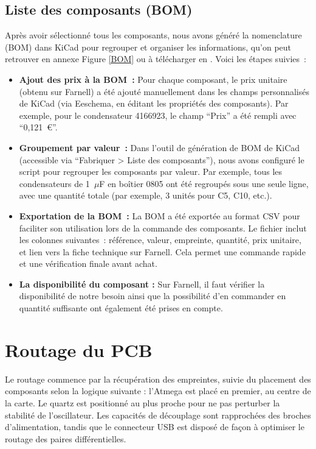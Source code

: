 \documentclass[12pt, a4paper, titlepage]{article}
\begin{document}
\subsection{Liste des composants (BOM)}

Après avoir sélectionné tous les composants, nous avons généré la nomenclature (BOM) dans KiCad pour regrouper et organiser les informations, qu'on peut retrouver en annexe Figure \ref{BOM} ou à télécharger en \cite{Lien BOM}. Voici les étapes suivies~:

\begin{itemize}
    \item \textbf{Ajout des prix à la BOM~:} Pour chaque composant, le prix unitaire (obtenu sur Farnell) a été ajouté manuellement dans les champs personnalisés de KiCad (via Eeschema, en éditant les propriétés des composants). Par exemple, pour le condensateur 4166923, le champ ``Prix'' a été rempli avec ``0,121~€''.
    \item \textbf{Groupement par valeur~:} Dans l’outil de génération de BOM de KiCad (accessible via ``Fabriquer > Liste des composants''), nous avons configuré le script pour regrouper les composants par valeur. Par exemple, tous les condensateurs de 1~$\mu$F en boîtier 0805 ont été regroupés sous une seule ligne, avec une quantité totale (par exemple, 3 unités pour C5, C10, etc.).
    \item \textbf{Exportation de la BOM~:} La BOM a été exportée au format CSV pour faciliter son utilisation lors de la commande des composants. Le fichier inclut les colonnes suivantes~: référence, valeur, empreinte, quantité, prix unitaire, et lien vers la fiche technique sur Farnell. Cela permet une commande rapide et une vérification finale avant achat.
    \item \textbf{La disponibilité du composant :} Sur Farnell, il faut vérifier la disponibilité de notre besoin ainsi que la possibilité d’en commander en quantité suffisante ont également été prises en compte.
\end{itemize}

\section{Routage du PCB}

Le routage commence par la récupération des empreintes, suivie du placement des composants selon la logique suivante : l'Atmega est placé en premier, au centre de la carte. Le quartz est positionné au plus proche pour ne pas perturber la stabilité de l’oscillateur. Les capacités de découplage sont rapprochées des broches d’alimentation, tandis que le connecteur USB est disposé de façon à optimiser le routage des paires différentielles.
\end{document}

